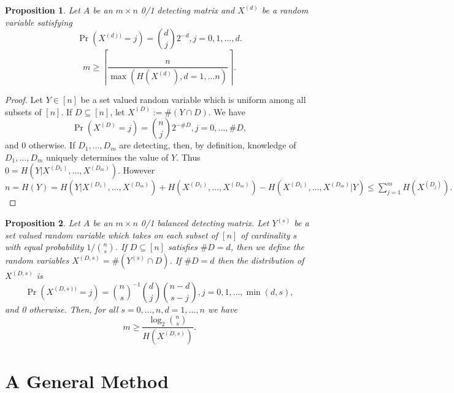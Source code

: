\documentclass{article}
\newtheorem{proposition}{Proposition}
\begin{document}
\begin{proposition}
  Let $A$ be an $m \times n$ 0/1 detecting matrix and
  $X^{(d)}$ be a random variable satisfying
  \begin{displaymath}
    \Pr(X^{(d))} = j) = \binom{d}{j} 2^{-d}, j=0, 1, \dots, d.
  \end{displaymath}
  \begin{equation}
    \label{eq:pippenger}
    m \ge \left \lceil \frac{n}{\max(H(X^{(d)}), d = 1, \dots n)}
    \right \rceil.
  \end{equation}
\end{proposition}
\begin{proof}
  Let $Y \in [n]$ be a set valued random variable which is uniform
  among all subsets of $[n]$.  If $D \subseteq [n]$, let $X^{(D)} := \#(Y
  \cap D)$.  We have
  \begin{displaymath}
    \Pr(X^{(D)} = j) = \binom{n}{j} 2^{-\#D}, j=0, \dots, \#D,
  \end{displaymath}
  and 0 otherwise.  If $D_1, \dots, D_m$ are detecting, then, by
  definition, knowledge of $D_1, \dots, D_m$ uniquely determines the
  value of $Y$.  Thus $0 = H(Y | X^{(D_1)}, \dots, X^{(D_m)})$.
  However $n = H(Y) = H(Y | X^{(D_1)}, \dots, X^{(D_m)}) +
  H(X^{(D_1)}, \dots, X^{(D_m)}) - H(X^{(D_1)},
  \dots, X^{(D_m)} | Y) \le \sum_{j=1}^m H(X^{(D_j)}).$
\end{proof}
\begin{proposition}
  Let $A$ be an $m \times n$ 0/1 balanced detecting matrix.
  Let $Y^{(s)}$ be a set valued random variable which takes on each subset
  of $[n]$ of cardinality $s$ with equal probability $1/\binom{n}{s}$.
  If $D \subseteq [n]$ satisfies $\# D = d$, then we define the random
  variables $X^{(D,s)} = \# (Y^{(s)} \cap D)$.
  If $\#D = d$ then the distribution of $X^{(D,s)}$ is
  \begin{displaymath}
    \Pr(X^{(D,s))} = j) = \binom{n}{s}^{-1}\binom{d}{j}
    \binom{n-d}{s - j}, j=0, 1, \dots, \min(d,s),
  \end{displaymath}
  and 0 otherwise.
  Then, for all $s = 0, \dots, n, d=1, \dots, n$ we have
  \begin{equation}
    \label{eq:better}
    m \ge \frac{\log_2 \binom{n}{s}}{H(X^{(D,s)})}.
  \end{equation}
\end{proposition}

\section{A General Method}
\label{sec:general}
\end{document}

